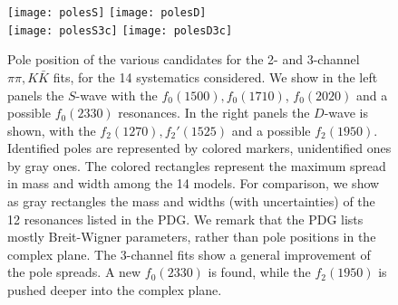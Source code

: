 \begin{figure}
{\centering
\texttt{[image: polesS]}  \texttt{[image: polesD]}} \\
{\centering
\texttt{[image: polesS3c]}  \texttt{[image: polesD3c]}}
\caption{\label{fig:poles2channel} Pole position of the various candidates for the 2- and 3-channel $\pi \pi, K \bar K$ fits, for the 14 systematics considered. We show in the left panels the $S$-wave with the $f_0(1500), f_0(1710)$, $f_0(2020)$ and a possible $f_0(2330)$ resonances. In the right panels the $D$-wave is shown, with the $f_2(1270), f_2'(1525)$ and a possible $f_2(1950)$. Identified poles are represented by colored markers, unidentified ones by gray ones. The colored rectangles represent the maximum spread in mass and width among the 14 models. For comparison, we show as gray rectangles the mass and widths (with uncertainties) of the 12 resonances listed in the PDG. We remark that the PDG lists mostly Breit-Wigner parameters, rather than pole positions in the complex plane. The 3-channel fits show a general improvement of the pole spreads. A new $f_0(2330)$ is found, while the $f_2(1950)$ is pushed deeper into the complex plane.
}
\end{figure}

